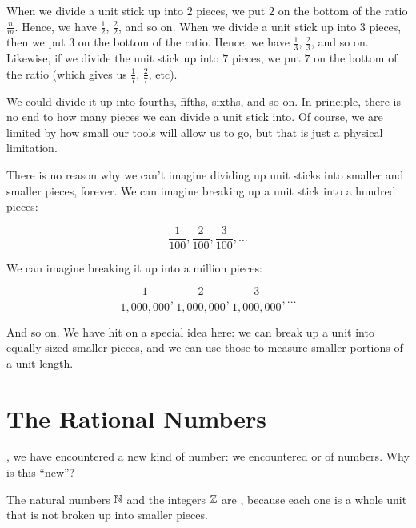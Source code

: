 \documentclass[../../../main.tex]{subfiles}
\begin{document}
\begin{aside}
  \begin{notation}
    When we divide a unit stick up into $2$ pieces, we put $2$ on the bottom of the ratio $\frac{n}{m}$. Hence, we have $\frac{1}{2}$, $\frac{2}{2}$, and so on. When we divide a unit stick up into $3$ pieces, then we put $3$ on the bottom of the ratio. Hence, we have $\frac{1}{3}$, $\frac{2}{3}$, and so on. Likewise, if we divide the unit stick up into $7$ pieces, we put $7$ on the bottom of the ratio (which gives us $\frac{1}{7}$, $\frac{2}{7}$, etc). 
  \end{notation}
\end{aside}

We could divide it up into fourths, fifths, sixths, and so on. In principle, there is no end to how many pieces we can divide a unit stick into. Of course, we are limited by how small our tools will allow us to go, but that is just a physical limitation. 

There is no reason why we can't imagine dividing up unit sticks into smaller and smaller pieces, forever. We can imagine breaking up a unit stick into a hundred pieces:

\begin{equation*}
  \frac{1}{100}, \frac{2}{100}, \frac{3}{100}, \ldots
\end{equation*}

We can imagine breaking it up into a million pieces:

\begin{equation*}
  \frac{1}{1,000,000}, \frac{2}{1,000,000}, \frac{3}{1,000,000}, \ldots
\end{equation*}

And so on. We have hit on a special idea here: we can break up a unit into equally sized smaller pieces, and we can use those to measure smaller portions of a unit length.



\section{The Rational Numbers}

, we have encountered a new kind of number: we encountered  or  of numbers. Why is this ``new''?

\begin{terminology}
  The natural numbers $\Nats/$ and the integers $\Ints/$ are , because each one is a whole unit that is not broken up into smaller pieces.
\end{terminology}
\end{document}
